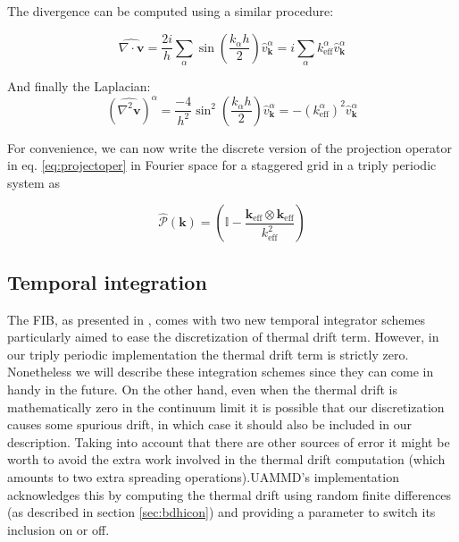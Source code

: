 \documentclass[ twoside,openright,titlepage,numbers=noenddot,%
headinclude,footinclude,cleardoublepage=empty,abstract=on,
BCOR=5mm,paper=a4,fontsize=11pt, dvipsnames
]{scrreprt}
\renewcommand{\vec}[1]{\bm{#1}}
\newcommand{\oper}[1]{\mathcal{#1}}
\newcommand{\uammd}{\gls{UAMMD}\xspace}
\newcommand{\fou}[1]{\widehat{#1}}
\begin{document}
The divergence can be computed using a similar procedure:

\begin{equation}
  \label{eq:staggereddivfou}
  \fou{\nabla\cdot\vec{v}} = \frac{2i}{h}\sum_\alpha\sin\left(\frac{k_\alpha h}{2}\right)\fou{v}_{\vec{k}}^\alpha = i \sum_\alpha k^\alpha_{\text{eff}}\fou{v}_{\vec{k}}^\alpha
\end{equation}

And finally the Laplacian:
\begin{equation}
  \label{eq:staggeredlapfou}
  \left(\fou{\nabla^2\vec{v}}\right)^ \alpha = \frac{-4}{h^2}\sin^2\left(\frac{k_\alpha h}{2}\right)\fou{v}_{\vec{k}}^\alpha = - \left(k^\alpha_{\text{eff}}\right)^2\fou{v}_{\vec{k}}^\alpha
\end{equation}

For convenience, we can now write the discrete version of the projection operator in eq. \eqref{eq:projectoper} in Fourier space for a staggered grid in a triply periodic system as

\begin{equation}
  \label{eq:staggeredprojection}
  \fou{\oper{P}}(\vec{k}) = \left(\mathbb{I} - \frac{\vec{k}_{\text{eff}}\otimes\vec{k}_{\text{eff}}}{k_{\text{eff}}^2}\right)
\end{equation}
\subsection*{Temporal integration}
The \gls{FIB}, as presented in \cite{Delong2014}, comes with two new temporal integrator schemes particularly aimed to ease the discretization of thermal drift term. However, in our triply periodic implementation the thermal drift term is strictly zero. Nonetheless we will describe these integration schemes since they can come in handy in the future. On the other hand, even when the thermal drift is mathematically zero in the continuum limit it is possible that our discretization causes some spurious drift, in which case it should also be included in our description.
Taking into account that there are other sources of error it might be worth to avoid the extra work involved in the thermal drift computation (which amounts to two extra spreading operations).\uammd's implementation acknowledges this by computing the thermal drift using random finite differences (as described in section \ref{sec:bdhicon}) and providing a parameter to switch its inclusion on or off.
\end{document}
